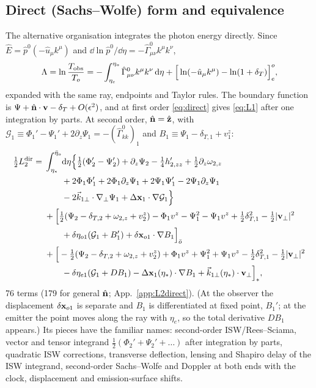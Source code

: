 \subsection{Direct (Sachs--Wolfe) form and equivalence}
\label{sec:L2direct}
The alternative organisation integrates the photon energy directly.  Since $\hat E=\hat p^0(-\hat u_\mu k^\mu)$ and
$\dd\ln\hat p^0/\dd\eta=-\hat\Gamma^0_{\mu\nu}k^\mu k^\nu$,
\begin{equation}
\Lambda=\ln\frac{T_{\rm obs}}{T_o}=-\int_{\eta_e}^{\eta_o}\hat\Gamma^0_{\mu\nu}k^\mu k^\nu\,\mathrm d\eta+\Big[\ln(-\hat u_\mu k^\mu)-\ln(1+\delta_T)\Big]_e^o ,
\label{eq:direct}
\end{equation}
expanded with the same ray, endpoints and Taylor rules.  The boundary function is $\Psi+\hat{\mathbf n}\cdot\mathbf v-\delta_T+O(\epsilon^2)$, and at
first order \eqref{eq:direct} gives \eqref{eq:L1} after one integration by parts.  At second order, $\hat{\mathbf n}=\hat{\mathbf z}$, with
$\mathcal G_1\equiv\Phi_1'-\Psi_1'+2\partial_z\Psi_1=-(\hat\Gamma^0_{kk})_1$ and $B_1\equiv\Psi_1-\delta_{T,1}+v^z_1$:
\begin{align}
\tfrac12L_2^{\rm dir}=\;&\int_{\eta_*}^{\bar\eta_o}\!\mathrm d\eta\Big\{\tfrac12(\Phi_2'-\Psi_2')+\partial_z\Psi_2-\tfrac14h'_{2,zz}+\tfrac12\partial_z\omega_{2,z}\nonumber\\
&\qquad+2\Phi_1\Phi_1'+2\Phi_1\partial_z\Psi_1+2\Psi_1\Psi_1'-2\Psi_1\partial_z\Psi_1\nonumber\\
&\qquad-2\vec k_{1\perp}\cdot\nabla_\perp\Psi_1+\Delta\mathbf x_1\cdot\nabla\mathcal G_1\Big\}\nonumber\\
&+\Big[\tfrac12(\Psi_2-\delta_{T,2}+\omega_{2,z}+v^z_2)-\Phi_1v^z-\Psi_1^2-\Psi_1v^z+\tfrac12\delta_{T,1}^2-\tfrac12|\mathbf v_\perp|^2\nonumber\\
&\qquad+\delta\eta_{o1}(\mathcal G_1+B_1')+\delta\mathbf x_{o1}\cdot\nabla B_1\Big]_{\bar o}\nonumber\\
&+\Big[-\tfrac12(\Psi_2-\delta_{T,2}+\omega_{2,z}+v^z_2)+\Phi_1v^z+\Psi_1^2+\Psi_1v^z-\tfrac12\delta_{T,1}^2-\tfrac12|\mathbf v_\perp|^2\nonumber\\
&\qquad-\delta\eta_{e1}(\mathcal G_1+DB_1)-\Delta\mathbf x_1(\eta_*)\cdot\nabla B_1+\vec k_{1\perp}(\eta_*)\cdot\mathbf v_\perp\Big]_*,
\label{eq:L2direct}
\end{align}
76 terms (179 for general $\hat{\mathbf n}$; App.~\ref{app:L2direct}).  (At the observer the displacement $\delta\mathbf x_{o1}$ is separate and $B_1$ is differentiated at fixed point, $B_1'$; at the emitter the point
moves along the ray with $\eta_e$, so the total derivative $DB_1$ appears.)  Its pieces have the familiar names: second-order ISW/Rees--Sciama,
vector and tensor integrand $\tfrac12(\Phi_2'+\Psi_2'+\ldots)$ after integration by parts, quadratic ISW corrections, transverse
deflection, lensing and Shapiro delay of the ISW integrand, second-order Sachs--Wolfe and Doppler at both ends with the
clock, displacement and emission-surface shifts.

